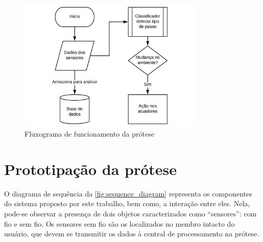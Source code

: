 \begin{figure}[ht]
	\caption{\label{fig:flowchart}Fluxograma de funcionamento da prótese}
	\begin{center}
	    \includegraphics[width=0.8\textwidth]{resources/flowchart}
	\end{center}
\end{figure}


\section{Prototipação da prótese}\label{sec:metodo_prototipacao}
O diagrama de sequência da \autoref{fig:sequence_diagram} representa os componentes do sistema proposto por este trabalho, bem como, a interação entre eles. Nela, pode-se observar a presença de dois objetos caracterizados como ``sensores'': com fio e sem fio. Os sensores sem fio são os localizados no membro intacto do usuário, que devem se transmitir os dados à central de processamento na prótese.

